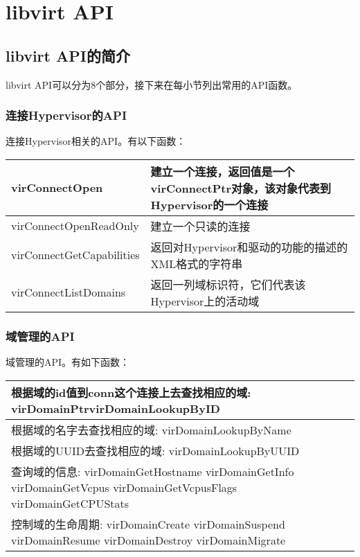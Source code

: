 \documentclass[a4paper,left=2.5cm,right=2.5cm,11pt]{article}
\begin{document}
\section{libvirt API}
\subsection{libvirt API的简介}
	libvirt API可以分为8个部分，接下来在每小节列出常用的API函数。
\subsubsection{连接Hypervisor的API}
		连接Hypervisor相关的API。有以下函数：
		\begin{longtable}{p{3.8cm}p{10.5cm}}
		\hline
		virConnectOpen & 建立一个连接，返回值是一个virConnectPtr对象，该对象代表到Hypervisor的一个连接 \\
		\hline
		virConnectOpenReadOnly & 建立一个只读的连接 \\
		\hline
		virConnectGetCapabilities & 返回对Hypervisor和驱动的功能的描述的XML格式的字符串 \\
		\hline
		virConnectListDomains & 返回一列域标识符，它们代表该Hypervisor上的活动域 \\
		\hline 
		\end{longtable}


\subsubsection{域管理的API}

		域管理的API。有如下函数：
		\begin{longtable}{p{15cm}}
		\hline
		根据域的id值到conn这个连接上去查找相应的域: virDomainPtrvirDomainLookupByID \\
		\hline
		根据域的名字去查找相应的域: virDomainLookupByName \\
		\hline
		根据域的UUID去查找相应的域: virDomainLookupByUUID  \\
		\hline
		查询域的信息: virDomainGetHostname virDomainGetInfo virDomainGetVcpus virDomainGetVcpusFlags virDomainGetCPUStats \\
		\hline
		控制域的生命周期: virDomainCreate virDomainSuspend virDomainResume virDomainDestroy virDomainMigrate \\
		\hline 
		\end{longtable}
\end{document}

